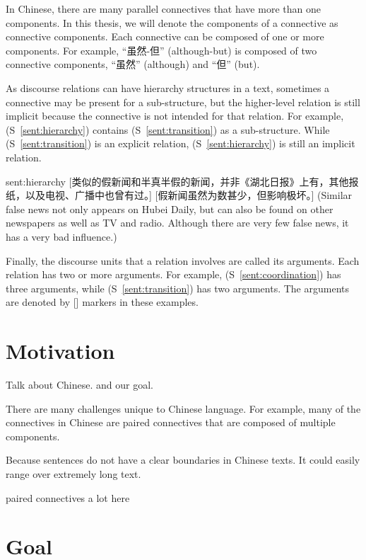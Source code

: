 In Chinese, there are many parallel connectives that have more than one components.
In this thesis, we will denote the components of a connective as connective components.
Each connective can be composed of one or more components. For example, ``虽然-但''
(although-but) is composed of two connective components, ``虽然'' (although)
and ``但'' (but).

As discourse relations can have hierarchy structures in a text, sometimes
a connective may be present for a sub-structure, but the higher-level relation
is still implicit because the connective is not intended for that relation.
For example, (S~\ref{sent:hierarchy}) contains (S~\ref{sent:transition})
as a sub-structure. While (S~\ref{sent:transition}) is an explicit relation,
(S~\ref{sent:hierarchy}) is still an implicit relation.

\begin{sent}{sent:hierarchy}{}
    [类似的假新闻和半真半假的新闻，并非《湖北日报》上有，其他报纸，以及电视、广播中也曾有过。]
    [假新闻虽然为数甚少，但影响极坏。]
    (Similar false news not only appears on Hubei Daily, but can also be found on
    other newspapers as well as TV and radio.
    Although there are very few false news, it has a very bad influence.)
\end{sent}

Finally, the discourse units that a relation involves are called its arguments.
Each relation has two or more arguments. For example, (S~\ref{sent:coordination}) has
three arguments, while (S~\ref{sent:transition}) has two arguments. The arguments are
denoted by [] markers in these examples.


%
%
\section{Motivation}

Talk about Chinese. and our goal.

There are many challenges unique to Chinese language. For example, many of the connectives
in Chinese are paired connectives that are composed of multiple components.

Because sentences do not have a clear boundaries in Chinese texts. It could easily range
over extremely long text.

paired connectives a lot here \citep{zhou2012pdtb}


%
%
\section{Goal}

